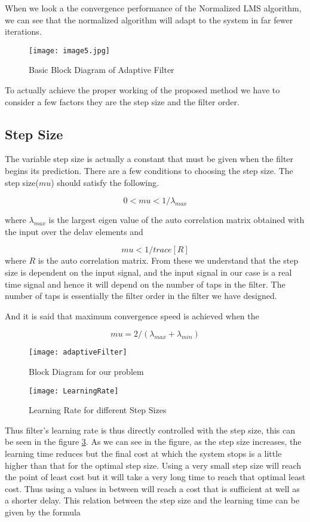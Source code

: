 \documentclass[conference]{IEEEtran}
\begin{document}
When we look a the convergence performance of the Normalized LMS algorithm, we can see that the normalized algorithm will adapt to the system in far fewer iterations.
 
 
 \begin{figure}
\centering
\texttt{[image: image5.jpg]}
\caption{Basic Block Diagram of Adaptive Filter}
\label{AdaptiveFilterBlockDiagram}
\end{figure}

 
 
 To actually achieve the proper working of the proposed method we have to consider a few factors they are the step size and the filter order.
 
 \subsection{Step Size} The variable step size is actually a constant that must be given when the filter begins its prediction. There are a few conditions to choosing the step size. The step size($mu$) should satisfy the following. 
 
 $$ 0 < mu < 1/\lambda_{max} $$ 
 
 where $\lambda_{max}$ is the largest eigen value of the auto correlation matrix obtained with the input over the delav elements and 
 
 $$ mu < 1/ trace[R] $$ where $R$ is the auto correlation matrix. From these we understand that the step size is dependent on the input signal, and the input signal in our case is a real time signal and hence it will depend on the number of taps in the filter. The number of taps is essentially the filter order in the filter we have designed. 
 
 And it is said that maximum convergence speed is achieved when the 
 
 $$ mu = 2/(\lambda_{max} + \lambda_{min}) $$
 
\begin{figure}
\centering
\texttt{[image: adaptiveFilter]}
\caption{Block Diagram for our problem}
\label{modifiedAdaptiveFilter}
\end{figure}
 
 
\begin{figure}
\centering
\texttt{[image: LearningRate]}
\caption{Learning Rate for different Step Sizes \cite{SCLIOLEarningRate}}
\label{LearningRatevsStepSize}
\end{figure}
 
 Thus filter's learning rate is thus directly controlled with the step size, this can be seen in the figure \ref{LearningRatevsStepSize}. \cite{SCLIOLEarningRate} As we can see in the figure, as the step size increases, the learning time reduces but the final cost at which the system stops is a little higher than that for the optimal step size. Using a very small step size will reach the point of least cost but it will take a very long time to reach that optimal least cost. Thus using a values in between will reach a cost that is sufficient at well as a shorter delay. This relation between the step size and the learning time can be given by the formula 
 
\end{document}
